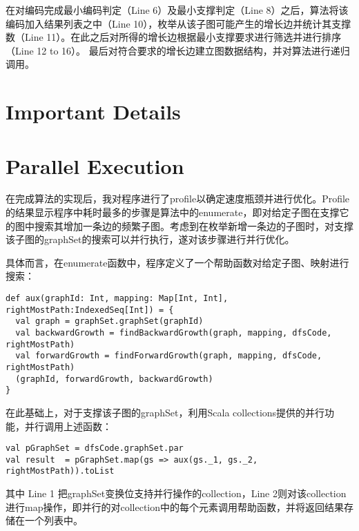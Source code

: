 \documentclass{article}
\begin{document}
在对编码完成最小编码判定（Line 6）及最小支撑判定（Line 8）之后，算法将该编码加入结果列表之中（Line 10），枚举从该子图可能产生的增长边并统计其支撑数（Line 11）。在此之后对所得的增长边根据最小支撑要求进行筛选并进行排序（Line 12 to 16）。
最后对符合要求的增长边建立图数据结构，并对算法进行递归调用。

\section{Important Details}
\subsection{}
\subsection{}
\subsection{}
\section{Parallel Execution}

在完成算法的实现后，我对程序进行了profile以确定速度瓶颈并进行优化。Profile的结果显示程序中耗时最多的步骤是算法中的enumerate，即对给定子图在支撑它的图中搜索其增加一条边的频繁子图。考虑到在枚举新增一条边的子图时，对支撑该子图的graphSet的搜索可以并行执行，遂对该步骤进行并行优化。

具体而言，在enumerate函数中，程序定义了一个帮助函数对给定子图、映射进行搜索：
\begin{lstlisting}[style=mStyle]
def aux(graphId: Int, mapping: Map[Int, Int], rightMostPath:IndexedSeq[Int]) = {
  val graph = graphSet.graphSet(graphId)
  val backwardGrowth = findBackwardGrowth(graph, mapping, dfsCode, rightMostPath)
  val forwardGrowth = findForwardGrowth(graph, mapping, dfsCode, rightMostPath)
  (graphId, forwardGrowth, backwardGrowth)
}
\end{lstlisting}

在此基础上，对于支撑该子图的graphSet，利用Scala collections提供的并行功能，并行调用上述函数：

\begin{lstlisting}[style=mStyle]
val pGraphSet = dfsCode.graphSet.par
val result  = pGraphSet.map(gs => aux(gs._1, gs._2, rightMostPath)).toList
\end{lstlisting}

其中 Line 1 把graphSet变换位支持并行操作的collection，Line 2则对该collection进行map操作，即并行的对collection中的每个元素调用帮助函数，并将返回结果存储在一个列表中。
\end{document}
